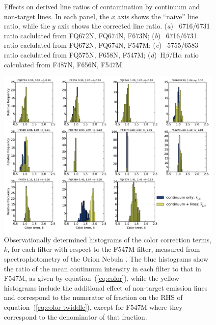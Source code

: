\documentclass[preprint]{aastex}
\begin{document}
\begin{figure}
\begin{tabular}{ll}
  \end{tabular}
  \caption{Effects on derived line ratios of contamination by
    continuum and non-target lines.  In each panel, the \(x\) axis
    shows the ``naive'' line ratio, while the \(y\) axis shows the
    corrected line ratio.  (\textit{a})~\sii{} 6716/6731 ratio
    caclulated from FQ672N, FQ674N, F673N; (\textit{b})~\sii{} 6716/6731 ratio
    caclulated from FQ672N, FQ674N, F547M; (\textit{c})~\nii{} 5755/6583 ratio
    caclulated from  FQ575N, F658N, F547M;
    (\textit{d})~H\(\beta\)/H\(\alpha\) ratio calculated from F487N,
    F656N, F547M.}
  \label{fig:contam}
\end{figure}

\begin{figure}
  \centering
  \includegraphics[width=\linewidth]{odh-k-color-histograms}
  \caption{Observationally determined histograms of the color
    correction terms, \(k\), for each filter with respect to the F547M
    filter, measured from spectrophotometry of the Orion Nebula
    \citep{ODell:2010a}.  The blue histograms show the ratio of the
    mean continuum intensity in each filter to that in F547M, as given
    by equation~(\ref{eq:color}), while the yellow histograms include
    the additional effect of non-target emission lines and correspond
    to the numerator of fraction on the RHS of
    equation~(\ref{eq:color-twiddle}), except for F547M where they
    correspond to the denominator of that fraction. }
  \label{fig:color-correction}
\end{figure}
\end{document}
